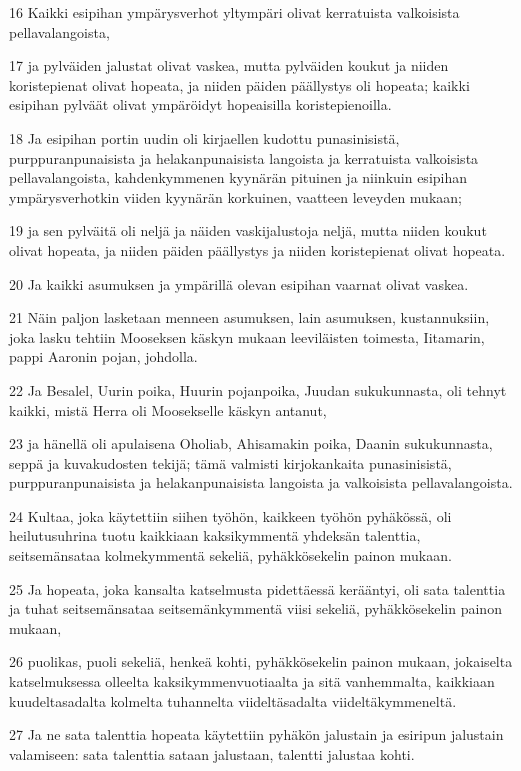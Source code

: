 \par 16 Kaikki esipihan ympärysverhot yltympäri olivat kerratuista valkoisista pellavalangoista,
\par 17 ja pylväiden jalustat olivat vaskea, mutta pylväiden koukut ja niiden koristepienat olivat hopeata, ja niiden päiden päällystys oli hopeata; kaikki esipihan pylväät olivat ympäröidyt hopeaisilla koristepienoilla.
\par 18 Ja esipihan portin uudin oli kirjaellen kudottu punasinisistä, purppuranpunaisista ja helakanpunaisista langoista ja kerratuista valkoisista pellavalangoista, kahdenkymmenen kyynärän pituinen ja niinkuin esipihan ympärysverhotkin viiden kyynärän korkuinen, vaatteen leveyden mukaan;
\par 19 ja sen pylväitä oli neljä ja näiden vaskijalustoja neljä, mutta niiden koukut olivat hopeata, ja niiden päiden päällystys ja niiden koristepienat olivat hopeata.
\par 20 Ja kaikki asumuksen ja ympärillä olevan esipihan vaarnat olivat vaskea.
\par 21 Näin paljon lasketaan menneen asumuksen, lain asumuksen, kustannuksiin, joka lasku tehtiin Mooseksen käskyn mukaan leeviläisten toimesta, Iitamarin, pappi Aaronin pojan, johdolla.
\par 22 Ja Besalel, Uurin poika, Huurin pojanpoika, Juudan sukukunnasta, oli tehnyt kaikki, mistä Herra oli Moosekselle käskyn antanut,
\par 23 ja hänellä oli apulaisena Oholiab, Ahisamakin poika, Daanin sukukunnasta, seppä ja kuvakudosten tekijä; tämä valmisti kirjokankaita punasinisistä, purppuranpunaisista ja helakanpunaisista langoista ja valkoisista pellavalangoista.
\par 24 Kultaa, joka käytettiin siihen työhön, kaikkeen työhön pyhäkössä, oli heilutusuhrina tuotu kaikkiaan kaksikymmentä yhdeksän talenttia, seitsemänsataa kolmekymmentä sekeliä, pyhäkkösekelin painon mukaan.
\par 25 Ja hopeata, joka kansalta katselmusta pidettäessä kerääntyi, oli sata talenttia ja tuhat seitsemänsataa seitsemänkymmentä viisi sekeliä, pyhäkkösekelin painon mukaan,
\par 26 puolikas, puoli sekeliä, henkeä kohti, pyhäkkösekelin painon mukaan, jokaiselta katselmuksessa olleelta kaksikymmenvuotiaalta ja sitä vanhemmalta, kaikkiaan kuudeltasadalta kolmelta tuhannelta viideltäsadalta viideltäkymmeneltä.
\par 27 Ja ne sata talenttia hopeata käytettiin pyhäkön jalustain ja esiripun jalustain valamiseen: sata talenttia sataan jalustaan, talentti jalustaa kohti.

